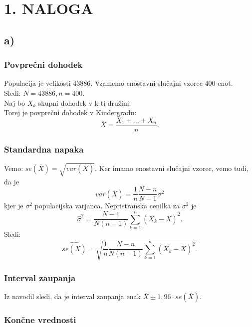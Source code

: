 \documentclass{article}
\begin{document}
\section*{1. NALOGA}
\subsection*{a)}
\subsubsection*{Povprečni dohodek}

Populacija je velikosti $43886$. Vzamemo enostavni slučajni vzorec $400$ enot.\\
Sledi: $N = 43886, n = 400$.\\
Naj bo $X_k$ skupni dohodek v k-ti družini.\\
Torej je povprečni dohodek v Kindergradu: 
\begin{equation}
\overline{X} = \frac{X_1 + ... + X_n}{n}.
\end{equation}

\subsubsection*{Standardna napaka}
Vemo: $se( \overline{X} ) = \sqrt{var( \overline{X} )}$. Ker imamo enostavni slučajni vzorec, vemo tudi, da je
\begin{equation}
var( \overline{X} ) = \frac{1}{n} \frac{N-n}{N-1} \sigma^2
\end{equation}
kjer je $\sigma^2$ populacijska varjanca. Nepristranska cenilka za $\sigma^2$ je
\begin{equation}
\hat{\sigma}^2 = \frac{N-1}{N(n-1)} \sum_{k=1}^{n}( X_k - \overline{X} )^2.
\end{equation}
Sledi:
\begin{equation}
\widehat{se(\overline{X})} = \sqrt{ \frac{1}{n} \frac{N-n}{N(n-1)} \sum_{k=1}^n (X_k - \overline{X} )^2.
}
\end{equation}

\subsubsection*{Interval zaupanja}
Iz navodil sledi, da je interval zaupanja enak $\overline{X} \pm 1,96 \cdot se( \overline{X} )$.

\subsubsection*{Končne vrednosti}
\end{document}
